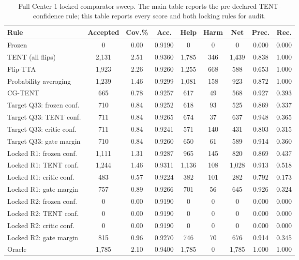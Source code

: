 \begin{table}[t]
\centering
\scriptsize
\setlength{\tabcolsep}{3pt}
\caption{Full Center-1-locked comparator sweep. The main table reports the pre-declared TENT-confidence rule; this table reports every score and both locking rules for audit.}
\label{tab:deployment-locked-full}
\begin{tabular}{@{}lcccccccc@{}}
\toprule
Rule & Accepted & Cov.\% & Acc. & Help & Harm & Net & Prec. & Rec. \\
\midrule
Frozen & 0 & 0.00 & 0.9190 & 0 & 0 & 0 & 0.000 & 0.000 \\
TENT (all flips) & 2{,}131 & 2.51 & 0.9360 & 1{,}785 & 346 & 1{,}439 & 0.838 & 1.000 \\
Flip-TTA & 1{,}923 & 2.26 & 0.9260 & 1{,}255 & 668 & 588 & 0.653 & 1.000 \\
Probability averaging & 1{,}239 & 1.46 & 0.9299 & 1{,}081 & 158 & 923 & 0.872 & 1.000 \\
CG-TENT & 665 & 0.78 & 0.9257 & 617 & 49 & 568 & 0.927 & 0.393 \\
Target Q33: frozen conf. & 710 & 0.84 & 0.9252 & 618 & 93 & 525 & 0.869 & 0.337 \\
Target Q33: TENT conf. & 711 & 0.84 & 0.9265 & 674 & 37 & 637 & 0.948 & 0.365 \\
Target Q33: critic conf. & 711 & 0.84 & 0.9241 & 571 & 140 & 431 & 0.803 & 0.315 \\
Target Q33: gate margin & 710 & 0.84 & 0.9260 & 650 & 61 & 589 & 0.914 & 0.360 \\
Locked R1: frozen conf. & 1{,}111 & 1.31 & 0.9287 & 965 & 145 & 820 & 0.869 & 0.437 \\
Locked R1: TENT conf. & 1{,}244 & 1.46 & 0.9311 & 1{,}136 & 108 & 1{,}028 & 0.913 & 0.518 \\
Locked R1: critic conf. & 483 & 0.57 & 0.9224 & 382 & 101 & 282 & 0.792 & 0.173 \\
Locked R1: gate margin & 757 & 0.89 & 0.9266 & 701 & 56 & 645 & 0.926 & 0.324 \\
Locked R2: frozen conf. & 0 & 0.00 & 0.9190 & 0 & 0 & 0 & 0.000 & 0.000 \\
Locked R2: TENT conf. & 0 & 0.00 & 0.9190 & 0 & 0 & 0 & 0.000 & 0.000 \\
Locked R2: critic conf. & 0 & 0.00 & 0.9190 & 0 & 0 & 0 & 0.000 & 0.000 \\
Locked R2: gate margin & 815 & 0.96 & 0.9270 & 746 & 70 & 676 & 0.914 & 0.345 \\
Oracle & 1{,}785 & 2.10 & 0.9400 & 1{,}785 & 0 & 1{,}785 & 1.000 & 1.000 \\
\bottomrule
\end{tabular}
\end{table}

